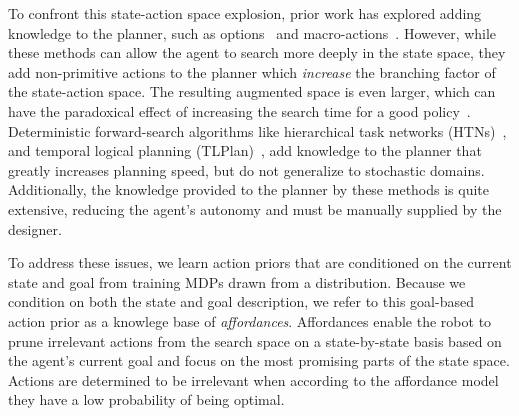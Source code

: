 To confront this state-action space explosion, prior work has explored
adding knowledge to the planner, such as options~\cite{sutton99} and
macro-actions~\cite{Botea:2005kx,Newton:2005vn}.  However, while these
methods can allow the agent to search more deeply in the state space,
they add non-primitive actions to the planner which {\em increase} the
branching factor of the state-action space.  The resulting augmented
space is even larger, which can have the paradoxical effect of
increasing the search time for a good policy~\cite{Jong:2008zr}.
Deterministic forward-search algorithms like hierarchical task
networks (HTNs)~\citep{Nau:1999:SSH:1624312.1624357}, and temporal
logical planning
(TLPlan)~\citep{Bacchus95usingtemporal,Bacchus99usingtemporal}, add
knowledge to the planner that greatly increases planning speed, but do
not generalize to stochastic domains. Additionally, the knowledge
provided to the planner by these methods is quite extensive, reducing
the agent's autonomy and must be manually supplied by the designer.

To address these issues, we learn action
priors that are conditioned on the current state and goal
from training MDPs drawn from a distribution. Because we
condition on both the state and goal description, we refer to this
goal-based action prior as a knowlege base of {\em affordances}.
Affordances enable the robot to prune irrelevant actions from the 
search space on a
state-by-state basis based on the agent's current goal and focus on
the most promising parts of the state space. Actions are determined
to be irrelevant when according to the affordance model they
have a low probability of being optimal.




